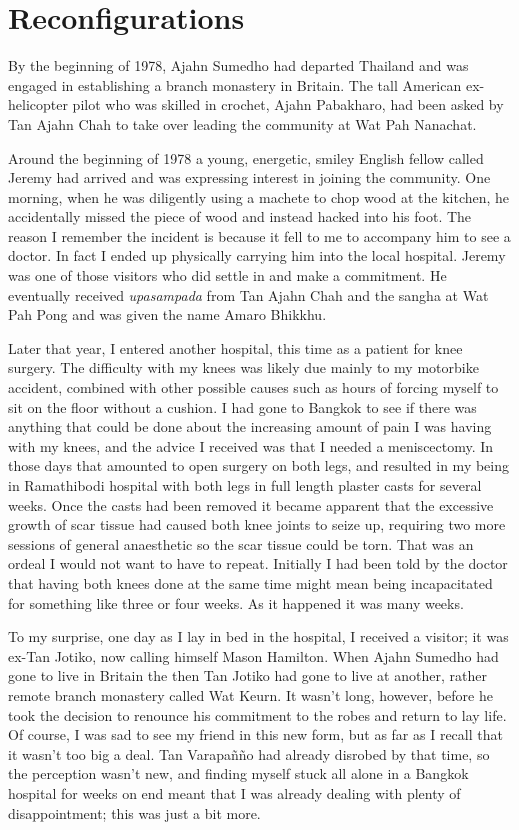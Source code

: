 \chapter{Reconfigurations}

By the beginning of 1978, Ajahn Sumedho had departed Thailand and was
engaged in establishing a branch monastery in Britain. The tall American
ex-helicopter pilot who was skilled in crochet, Ajahn Pabakharo, had
been asked by Tan Ajahn Chah to take over leading the community at Wat
Pah Nanachat.

Around the beginning of 1978 a young, energetic, smiley English fellow
called Jeremy had arrived and was expressing interest in joining the
community. One morning, when he was diligently using a machete to chop
wood at the kitchen, he accidentally missed the piece of wood and
instead hacked into his foot. The reason I remember the incident is
because it fell to me to accompany him to see a doctor. In fact I ended
up physically carrying him into the local hospital. Jeremy was one of
those visitors who did settle in and make a commitment. He eventually
received \emph{upasampada} from Tan Ajahn Chah and the sangha at Wat Pah
Pong and was given the name Amaro Bhikkhu.

Later that year, I entered another hospital, this time as a patient for knee
surgery. The difficulty with my knees was likely due mainly to my motorbike
accident, combined with other possible causes such as hours of forcing myself to
sit on the floor without a cushion.
I had gone to Bangkok to see if there was anything that could
be done about the increasing amount of pain I was having with my knees,
and the advice I received was that I needed a meniscectomy. In those
days that amounted to open surgery on both legs, and resulted in my
being in Ramathibodi hospital with both legs in full length plaster
casts for several weeks. Once the casts had been removed it became
apparent that the excessive growth of scar tissue had caused both knee
joints to seize up, requiring two more sessions of general anaesthetic
so the scar tissue could be torn. That was an ordeal I would not want to
have to repeat. Initially I had been told by the doctor that having both
knees done at the same time might mean being incapacitated for something
like three or four weeks. As it happened it was many weeks.

To my surprise, one day as I lay in bed in the hospital, I received a
visitor; it was ex-Tan Jotiko, now calling himself Mason Hamilton. When
Ajahn Sumedho had gone to live in Britain the then Tan Jotiko had gone to live
at another, rather remote branch monastery called Wat Keurn. It wasn't
long, however, before he took the decision to renounce his commitment to
the robes and return to lay life. Of course, I was sad to see my friend
in this new form, but as far as I recall that it wasn't too big a deal.
Tan Varapañño had already disrobed by that time, so the perception
wasn't new, and finding myself stuck all alone in a Bangkok hospital for
weeks on end meant that I was already dealing with plenty of
disappointment; this was just a bit more.

